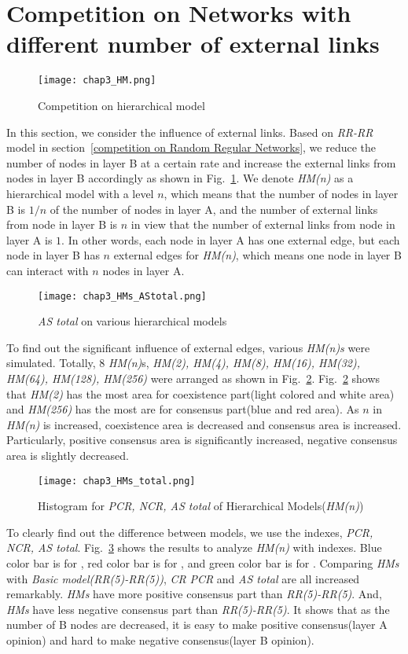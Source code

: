 \section{Competition on Networks with different number of external links}
\begin{figure}[!htb]
	\centering
	\texttt{[image: chap3\_HM.png]}
	\caption{Competition on hierarchical model}
	\label{chap3_HM}
\end{figure}
In this section, we consider the influence of external links. Based on \textit{RR-RR} model in section~\ref{competition on Random Regular Networks}, we reduce the number of nodes in layer B at a certain rate and increase the external links from nodes in layer B accordingly as shown in Fig.~\ref{chap3_HM}.  We denote \textit{HM(n)} as a hierarchical model with a level $n$, which means that the number of nodes in layer B is $1/n$ of the number of nodes in layer A, and the number of external links from node in layer B is $n$ in view that the number of external links from node in layer A is $1$. In other words, each node in layer A has one external edge, but each node in layer B has $n$ external edges for \textit{HM(n)}, which means one node in layer B can interact with $n$ nodes in layer A.
\begin{figure}[!htb]
	\centering
	\texttt{[image: chap3\_HMs\_AStotal.png]}
	\caption{\textit{AS total} on various hierarchical models}
	\label{chap3_HMs_AStotal}
\end{figure}
To find out the significant influence of external edges, various \textit{HM(n)s} were simulated.  Totally, $8$ \textit{HM(n)}s, \textit{HM(2), HM(4), HM(8), HM(16), HM(32), HM(64), HM(128), HM(256)} were arranged as shown in Fig.~\ref{chap3_HMs_AStotal}.  
Fig.~\ref{chap3_HMs_AStotal} shows that \textit{HM(2)} has the most area for coexistence part(light colored and white area) and \textit{HM(256)} has the most are for consensus part(blue and red area). As $n$ in \textit{HM(n)} is increased, coexistence area is decreased and consensus area is increased. Particularly, positive consensus area is significantly increased, negative consensus area is slightly decreased.  
\begin{figure}[!htb]
	\centering
	\texttt{[image: chap3\_HMs\_total.png]}
	\caption{Histogram for \textit{PCR, NCR, AS total} of Hierarchical Models(\textit{HM(n)})}
	\label{chap3_HMs_total}
\end{figure}
To clearly find out the difference between models, we use the indexes, \textit{PCR, NCR, AS total}. Fig.~\ref{chap3_HMs_total} shows the results to analyze \textit{HM(n)} with indexes. Blue color bar is for , red color bar is for , and green color bar is for . Comparing \textit{HMs} with \textit{Basic model(RR(5)-RR(5))}, \textit{CR} \textit{PCR} and \textit{AS total} are all increased remarkably. \textit{HMs} have more positive consensus part than \textit{RR(5)-RR(5)}. And, \textit{HMs} have less negative consensus part than \textit{RR(5)-RR(5)}. It shows that as the number of B nodes are decreased, it is easy to make positive consensus(layer A opinion) and hard to make negative consensus(layer B opinion).  

